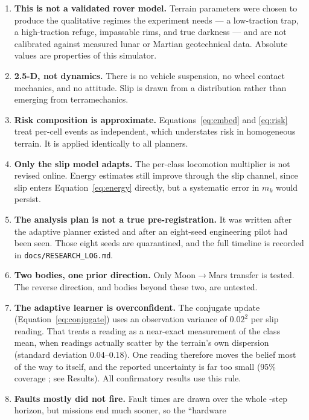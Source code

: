 \documentclass[11pt]{article}
\begin{document}
\begin{enumerate}[leftmargin=2em]
  \item \textbf{This is not a validated rover model.} Terrain parameters were
  chosen to produce the qualitative regimes the experiment needs --- a
  low-traction trap, a high-traction refuge, impassable rims, and true
  darkness --- and are not calibrated against measured lunar or Martian
  geotechnical data. Absolute values are properties of this simulator.
  \item \textbf{2.5-D, not dynamics.} There is no vehicle suspension, no wheel
  contact mechanics, and no attitude. Slip is drawn from a distribution rather
  than emerging from terramechanics.
  \item \textbf{Risk composition is approximate.} Equations~\ref{eq:embed} and
  \ref{eq:risk} treat per-cell events as independent, which understates risk in
  homogeneous terrain. It is applied identically to all planners.
  \item \textbf{Only the slip model adapts.} The per-class locomotion
  multiplier is not revised online. Energy estimates still improve through the
  slip channel, since slip enters Equation~\ref{eq:energy} directly, but a
  systematic error in $m_k$ would persist.
  \item \textbf{The analysis plan is not a true pre-registration.} It was
  written after the adaptive planner existed and after an eight-seed
  engineering pilot had been seen. Those eight seeds are quarantined, and the
  full timeline is recorded in \texttt{docs/RESEARCH\_LOG.md}.
  \item \textbf{Two bodies, one prior direction.} Only Moon$\rightarrow$Mars
  transfer is tested. The reverse direction, and bodies beyond these two, are
  untested.
  \item \textbf{The adaptive learner is overconfident.} The conjugate update
  (Equation~\ref{eq:conjugate}) uses an observation variance of $0.02^2$ per
  slip reading. That treats a reading as a near-exact measurement of the class
  mean, when readings actually scatter by the terrain's own dispersion
  (standard deviation 0.04--0.18). One reading therefore moves the belief most
  of the way to itself, and the reported uncertainty is far too small (95\%
  coverage \AuditCoverageCommitted{}; see Results). All confirmatory results use
  this rule.
  \item \textbf{Faults mostly did not fire.} Fault times are drawn over the whole
  \AuditHorizon-step horizon, but missions end much sooner, so the ``hardware

\end{enumerate}
\end{document}
